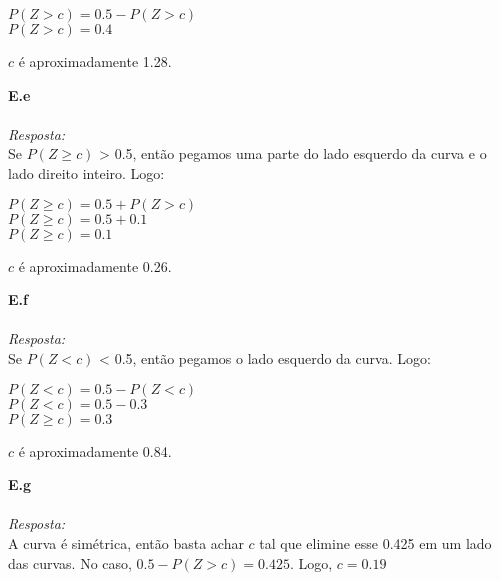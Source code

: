 \documentclass{article}
\begin{document}
    \begin{center}
    	$P(Z > c) = 0.5 - P(Z > c)$\\
    	$P(Z > c) = 0.4$\\
    \end{center}

    $c$ é aproximadamente 1.28.
    
    \textbf {E.e} 
    \\ \\
    \textit {Resposta:} \\
    
    Se $P(Z \geq c)$ > 0.5, então pegamos uma parte do lado esquerdo da curva e o lado direito inteiro.  Logo:\\
    
    \begin{center}
    	$P(Z \geq c) = 0.5 + P(Z > c)$\\
    	$P(Z \geq c) = 0.5 + 0.1$\\
    	$P(Z \geq c) = 0.1$
    \end{center}
    
    $c$ é aproximadamente 0.26.
	
	\textbf {E.f} 
	\\ \\
	\textit {Resposta:} \\
	
	Se $P(Z < c)$ < 0.5, então pegamos o lado esquerdo da curva.  Logo:\\
	
	\begin{center}
		$P(Z < c) = 0.5 - P(Z < c)$\\
		$P(Z < c) = 0.5 - 0.3$\\
		$P(Z \geq c) = 0.3$
	\end{center}
		
	$c$ é aproximadamente 0.84.
	
	\textbf {E.g} 
	\\ \\
	\textit {Resposta:} \\
	
	A curva é simétrica, então basta achar $c$ tal que elimine esse 0.425 em um lado das curvas. No caso, $0.5 - P(Z > c) = 0.425$. Logo, $c = 0.19$
	
\end{document}
